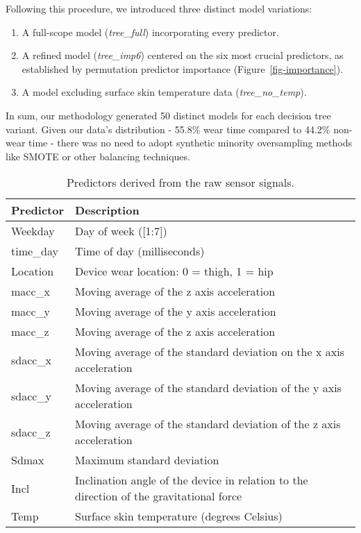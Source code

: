 \documentclass[
  9pt,
]{scrbook}
\begin{document}
Following this procedure, we introduced three distinct model variations:

\begin{enumerate}
\def\labelenumi{\arabic{enumi}.}
\item
  A full-scope model (\emph{tree\_full}) incorporating every predictor.
\item
  A refined model (\emph{tree\_imp6}) centered on the six most crucial
  predictors, as established by permutation predictor importance
  (Figure~\ref{fig-importance}).
\item
  A model excluding surface skin temperature data
  (\emph{tree\_no\_temp}).
\end{enumerate}

In sum, our methodology generated 50 distinct models for each decision
tree variant. Given our data's distribution - 55.8\% wear time compared
to 44.2\% non-wear time - there was no need to adopt synthetic minority
oversampling methods like SMOTE or other balancing techniques.

\begingroup

\footnotesize

\hypertarget{tbl-8}{}
\begin{longtable}{ll}
\caption{\label{tbl-8}Predictors derived from the raw sensor signals. }\tabularnewline

\toprule
Predictor & Description \\ 
\midrule
Weekday & Day of week ([1:7]) \\ 
time\_day & Time of day (milliseconds) \\ 
Location & Device wear location: 0 = thigh, 1 = hip \\ 
macc\_x & Moving average of the z axis acceleration \\ 
macc\_y & Moving average of the y axis acceleration \\ 
macc\_z & Moving average of the z axis acceleration \\ 
sdacc\_x & Moving average of the standard deviation on the x axis acceleration \\ 
sdacc\_y & Moving average of the standard deviation of the y axis acceleration \\ 
sdacc\_z & Moving average of the standard deviation of the z axis acceleration \\ 
Sdmax & Maximum standard deviation \\ 
Incl & Inclination angle of the device in relation to the direction of the gravitational force \\ 
Temp & Surface skin temperature (degrees Celsius) \\ 
\bottomrule
\end{longtable}
\end{document}

